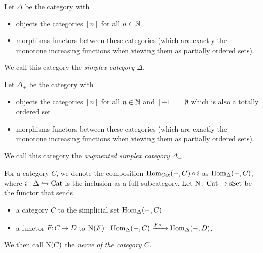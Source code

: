 \begin{definition}
    Let $\Delta$ be the category with
    \begin{itemize}
        \item objects the categories $[n]$ for all $n\in\mathbb{N}$
        \item morphisms functors between these categories (which are exactly the monotone increasing functions when viewing them as partially ordered sets).
    \end{itemize}
    We call this category the \emph{simplex category $\Delta$}.
\end{definition}
\begin{definition}
    Let $\Delta_+$ be the category with
    \begin{itemize}
        \item objects the categories $[n]$ for all $n\in\mathbb{N}$ and $[-1]=\emptyset$ which is also a totally ordered set
        \item morphisms functors between these categories (which are exactly the monotone increasing functions when viewing them as partially ordered sets).
    \end{itemize}
    We call this category the \emph{augmented simplex category $\Delta_+$}.
\end{definition}
\begin{definition} %
    For a category $C$, we denote the composition $\operatorname{Hom}_{\operatorname{Cat}}(-,C)\circ i$ as $\operatorname{Hom}_{\Delta}(-,C)$, where $i:\Delta\xhookrightarrow{}\operatorname{Cat}$ is the inclusion as a full subcategory.
    Let $\operatorname{N}\colon\operatorname{Cat}\to\operatorname{sSet}$ be the functor that sends
    \begin{itemize}
        \item a category $C$ to the simplicial set $\operatorname{Hom}_{\Delta}(-,C)$
        \item a functor $F:C\to D$ to $\operatorname{N}(F)\colon\operatorname{Hom}_{\Delta}(-,C)\xrightarrow{F\circ -}\operatorname{Hom}_{\Delta}(-,D)$\;.
    \end{itemize}
    We then call $\operatorname{N}(C)$ the \emph{nerve of the category $C$}.
\end{definition}
